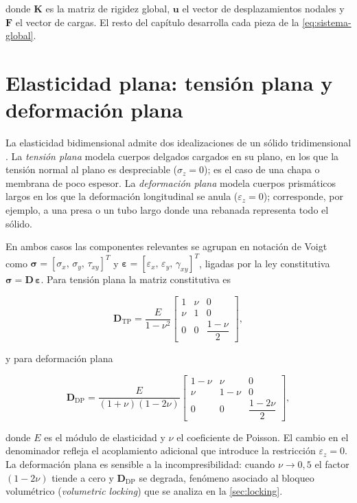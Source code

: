 donde $\bm{K}$ es la matriz de rigidez global, $\bm{u}$ el vector de desplazamientos nodales y $\bm{F}$ el vector de cargas. El resto del capítulo desarrolla cada pieza de la \autoref{eq:sistema-global}.

\section{Elasticidad plana: tensión plana y deformación plana}
\label{sec:elasticidad-plana}

La elasticidad bidimensional admite dos idealizaciones de un sólido tridimensional \autocites[pp.~11-12]{timoshenko1970elasticity}[pp.~79, 94]{cook2002concepts}. La \emph{tensión plana} modela cuerpos delgados cargados en su plano, en los que la tensión normal al plano es despreciable ($\sigma_z = 0$); es el caso de una chapa o membrana de poco espesor. La \emph{deformación plana} modela cuerpos prismáticos largos en los que la deformación longitudinal se anula ($\varepsilon_z = 0$); corresponde, por ejemplo, a una presa o un tubo largo donde una rebanada representa todo el sólido.

En ambos casos las componentes relevantes se agrupan en notación de Voigt como $\bm{\sigma} = [\sigma_x,\, \sigma_y,\, \tau_{xy}]^T$ y $\bm{\varepsilon} = [\varepsilon_x,\, \varepsilon_y,\, \gamma_{xy}]^T$, ligadas por la ley constitutiva $\bm{\sigma} = \bm{D}\,\bm{\varepsilon}$. Para tensión plana la matriz constitutiva es

\begin{equation}
\bm{D}_{\text{TP}} = \frac{E}{1-\nu^{2}}
\begin{bmatrix}
1 & \nu & 0 \\
\nu & 1 & 0 \\
0 & 0 & \dfrac{1-\nu}{2}
\end{bmatrix},
\label{eq:D-tension-plana}
\end{equation}

y para deformación plana

\begin{equation}
\bm{D}_{\text{DP}} = \frac{E}{(1+\nu)(1-2\nu)}
\begin{bmatrix}
1-\nu & \nu & 0 \\
\nu & 1-\nu & 0 \\
0 & 0 & \dfrac{1-2\nu}{2}
\end{bmatrix},
\label{eq:D-deformacion-plana}
\end{equation}

donde $E$ es el módulo de elasticidad y $\nu$ el coeficiente de Poisson. El cambio en el denominador refleja el acoplamiento adicional que introduce la restricción $\varepsilon_z = 0$. La deformación plana es sensible a la incompresibilidad: cuando $\nu \to 0{,}5$ el factor $(1-2\nu)$ tiende a cero y $\bm{D}_{\text{DP}}$ se degrada, fenómeno asociado al bloqueo volumétrico (\emph{volumetric locking}) que se analiza en la \autoref{sec:locking}.

